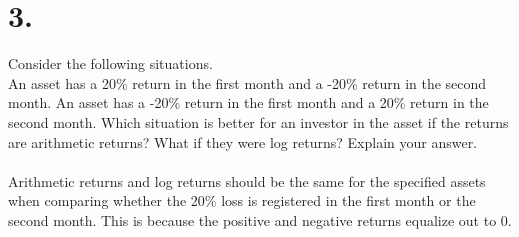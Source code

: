 \documentclass{article}
\begin{document}
\section*{3.}
{\Large 

Consider the following situations. \\
An asset has a 20\% return in the first month and a -20\% return in the second month.
An asset has a -20\% return in the first month and a 20\% return in the second month.
Which situation is better for an investor in the asset if the returns are arithmetic returns? What if they were log returns? Explain your answer. \\ \\

Arithmetic returns and log returns should be the same for the specified assets when comparing whether the 20\% loss is registered in the first month or the second month. This is because the positive and negative returns equalize out to 0.

}
\end{document}
